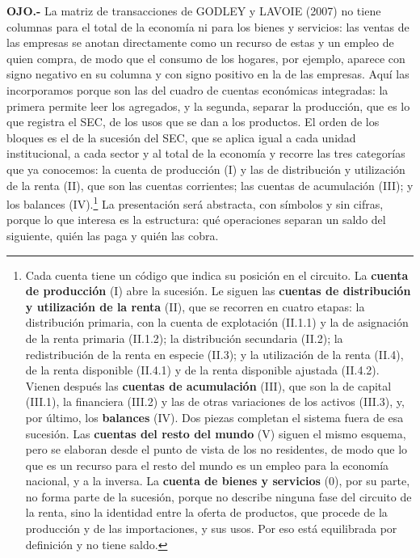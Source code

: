 \documentclass[10pt,a4paper]{article}
\begin{document}
{    \textbf{OJO.-} La matriz de transacciones de GODLEY y LAVOIE (2007) no tiene columnas para el total de la economía ni para los bienes y servicios: las ventas de las empresas se anotan directamente como un recurso de estas y un empleo de quien compra, de modo que el consumo de los hogares, por ejemplo, aparece con signo negativo en su columna y con signo positivo en la de las empresas. Aquí las incorporamos porque son las del cuadro de cuentas económicas integradas: la primera permite leer los agregados, y la segunda, separar la producción, que es lo que registra el SEC, de los usos que se dan a los productos.
} El orden de los bloques es el de la sucesión del SEC, que se aplica igual a cada unidad institucional, a cada sector y al total de la economía y recorre las tres categorías que ya conocemos: la cuenta de producción (I) y las de distribución y utilización de la renta (II), que son las cuentas corrientes; las cuentas de acumulación (III); y los balances (IV).\footnote{%
    Cada cuenta tiene un código que indica su posición en el circuito. La \textbf{cuenta de producción} (I) abre la sucesión. Le siguen las \textbf{cuentas de distribución y utilización de la renta} (II), que se recorren en cuatro etapas: la distribución primaria, con la cuenta de explotación (II.1.1) y la de asignación de la renta primaria (II.1.2); la distribución secundaria (II.2); la redistribución de la renta en especie (II.3); y la utilización de la renta (II.4), de la renta disponible (II.4.1) y de la renta disponible ajustada (II.4.2). Vienen después las \textbf{cuentas de acumulación} (III), que son la de capital (III.1), la financiera (III.2) y las de otras variaciones de los activos (III.3), y, por último, los \textbf{balances} (IV). Dos piezas completan el sistema fuera de esa sucesión. Las \textbf{cuentas del resto del mundo} (V) siguen el mismo esquema, pero se elaboran desde el punto de vista de los no residentes, de modo que lo que es un recurso para el resto del mundo es un empleo para la economía nacional, y a la inversa. La \textbf{cuenta de bienes y servicios} (0), por su parte, no forma parte de la sucesión, porque no describe ninguna fase del circuito de la renta, sino la identidad entre la oferta de productos, que procede de la producción y de las importaciones, y sus usos. Por eso está equilibrada por definición y no tiene saldo.
} La presentación será abstracta, con símbolos y sin cifras, porque lo que interesa es la estructura: qué operaciones separan un saldo del siguiente, quién las paga y quién las cobra.
\end{document}
